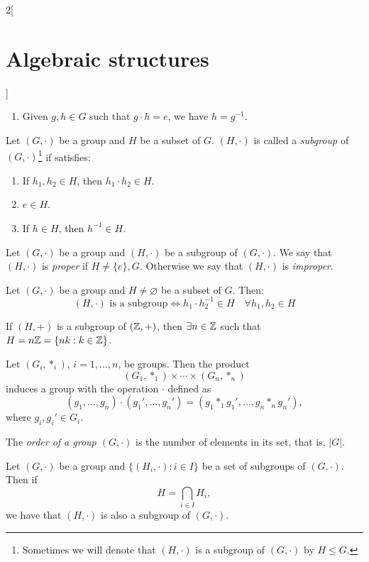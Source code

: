 \documentclass[../../../main.tex]{subfiles}
\begin{document}
\begin{multicols}{2}[\section{Algebraic structures}]
\begin{lemma}
\begin{enumerate}
            \item Given $g,h\in G$ such that $g\cdot h=e$, we have $h=g^{-1}$.
        \end{enumerate}
    \end{lemma}
    \begin{definition}[Subgroup]
        Let $(G,\cdot)$ be a group and $H$ be a subset of $G$. $(H,\cdot)$ is called a \textit{subgroup} of $(G,\cdot)$\footnote{Sometimes we will denote that $(H,\cdot)$ is a subgroup of $(G,\cdot)$ by $H\leq G$.} if satisfies:
        \begin{enumerate}
            \item If $h_1,h_2\in H$, then $h_1\cdot h_2\in H$.
            \item $e\in H$.
            \item If $h\in H$, then $h^{-1}\in H$.
        \end{enumerate}
    \end{definition}
    \begin{definition}
        Let $(G,\cdot)$ be a group and $(H,\cdot)$ be a subgroup of $(G,\cdot)$. We say that $(H,\cdot)$ is \textit{proper} if $H\ne\{e\},G$. Otherwise we say that $(H,\cdot)$ is \textit{improper}.
    \end{definition}
    \begin{prop}
        Let $(G,\cdot)$ be a group and $H\ne\varnothing$ be a subset of $G$. Then: $$(H,\cdot)\text{ is a subgroup}\iff h_1\cdot h_2^{-1}\in H\quad\forall h_1,h_2\in H$$
    \end{prop}
    \begin{prop}
        If $(H,+)$ is a subgroup of $(\mathbb{Z} ,+)$, then $\exists n\in\mathbb{Z} $ such that $H=n\mathbb{Z} =\{nk:k\in\mathbb{Z} \}$.
    \end{prop}
    \begin{prop}
        Let $(G_i,*_i)$, $i=1,\ldots, n$, be groups. Then the product $$(G_1,*_1)\times\cdots\times(G_n,*_n)$$ induces a group with the operation $\cdot$ defined as $$(g_1,\ldots,g_n)\cdot(g_1',\ldots,g_n')=(g_1*_1g_1',\ldots,g_n*_ng_n'),$$ where $g_i,g_i'\in G_i$.
    \end{prop}
    \begin{definition}
        The \textit{order of a group $(G,\cdot)$} is the number of elements in its set, that is, $|G|$.
    \end{definition}
    \begin{lemma}
        Let $(G,\cdot)$ be a group and $\{(H_i,\cdot):i\in I\}$ be a set of subgroups of $(G,\cdot)$. Then if $$H=\displaystyle\bigcap_{i\in I}H_i,$$ we have that $(H,\cdot)$ is also a subgroup of $(G,\cdot)$.

\end{lemma}
\end{multicols}
\end{document}
